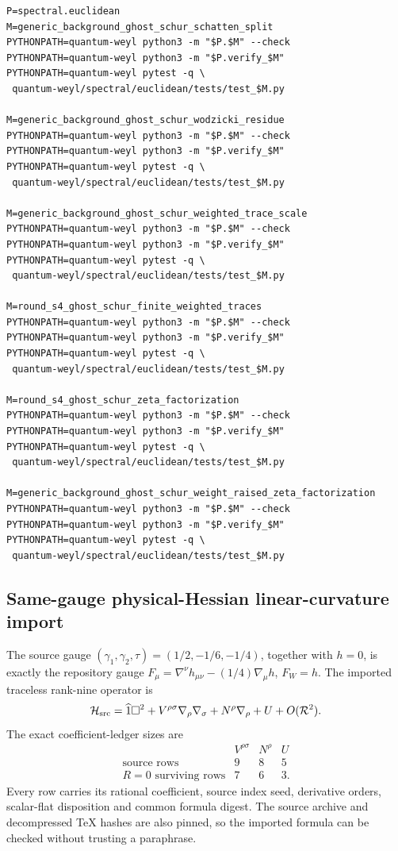 \documentclass[11pt]{article}
\theoremstyle{definition}
\theoremstyle{remark}
\begin{document}
\begin{verbatim}
P=spectral.euclidean
M=generic_background_ghost_schur_schatten_split
PYTHONPATH=quantum-weyl python3 -m "$P.$M" --check
PYTHONPATH=quantum-weyl python3 -m "$P.verify_$M"
PYTHONPATH=quantum-weyl pytest -q \
 quantum-weyl/spectral/euclidean/tests/test_$M.py

M=generic_background_ghost_schur_wodzicki_residue
PYTHONPATH=quantum-weyl python3 -m "$P.$M" --check
PYTHONPATH=quantum-weyl python3 -m "$P.verify_$M"
PYTHONPATH=quantum-weyl pytest -q \
 quantum-weyl/spectral/euclidean/tests/test_$M.py

M=generic_background_ghost_schur_weighted_trace_scale
PYTHONPATH=quantum-weyl python3 -m "$P.$M" --check
PYTHONPATH=quantum-weyl python3 -m "$P.verify_$M"
PYTHONPATH=quantum-weyl pytest -q \
 quantum-weyl/spectral/euclidean/tests/test_$M.py

M=round_s4_ghost_schur_finite_weighted_traces
PYTHONPATH=quantum-weyl python3 -m "$P.$M" --check
PYTHONPATH=quantum-weyl python3 -m "$P.verify_$M"
PYTHONPATH=quantum-weyl pytest -q \
 quantum-weyl/spectral/euclidean/tests/test_$M.py

M=round_s4_ghost_schur_zeta_factorization
PYTHONPATH=quantum-weyl python3 -m "$P.$M" --check
PYTHONPATH=quantum-weyl python3 -m "$P.verify_$M"
PYTHONPATH=quantum-weyl pytest -q \
 quantum-weyl/spectral/euclidean/tests/test_$M.py

M=generic_background_ghost_schur_weight_raised_zeta_factorization
PYTHONPATH=quantum-weyl python3 -m "$P.$M" --check
PYTHONPATH=quantum-weyl python3 -m "$P.verify_$M"
PYTHONPATH=quantum-weyl pytest -q \
 quantum-weyl/spectral/euclidean/tests/test_$M.py
\end{verbatim}

\subsection{Same-gauge physical-Hessian linear-curvature import}

The source gauge
$(\gamma_1,\gamma_2,\tau)=(1/2,-1/6,-1/4)$, together with $h=0$, is
exactly the repository gauge
$F_\mu=\nabla^\nu h_{\mu\nu}-(1/4)\nabla_\mu h$, $F_W=h$.
The imported traceless rank-nine operator is
\[
 \mathcal H_{\rm src}=\widehat1\Box^2
  +V^{\rho\sigma}\nabla_\rho\nabla_\sigma
  +N^\rho\nabla_\rho+U+O(\mathcal R^2).
\]
The exact coefficient-ledger sizes are
\[
\begin{array}{c|ccc}
 &V^{\rho\sigma}&N^\rho&U\\ \hline
 \text{source rows}&9&8&5\\
 R=0\text{ surviving rows}&7&6&3.
\end{array}
\]
Every row carries its rational coefficient, source index seed, derivative
orders, scalar-flat disposition and common formula digest.  The source
archive and decompressed TeX hashes are also pinned, so the imported formula
can be checked without trusting a paraphrase.
\end{document}
